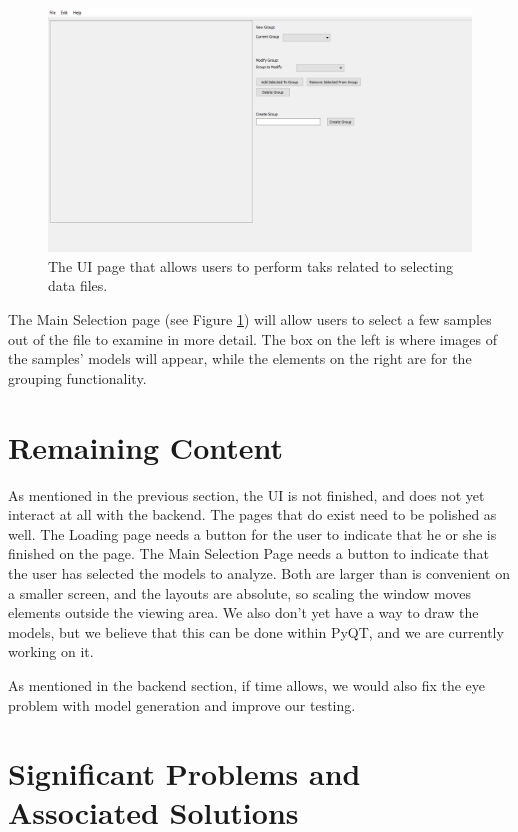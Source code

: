 \documentclass[letterpaper,10pt, onecolumn]{IEEEtran}
\begin{document}
\begin{figure}
	\includegraphics[width=\textwidth]{MainInterface}
	\caption{The UI page that allows users to perform taks related to selecting data files.}
	\label{fig:MainInterface}
\end{figure}

The Main Selection page (see Figure \ref{fig:MainInterface}) will allow users to select a few samples out of the file to examine in more detail. The box on the left is where images of the samples' models will appear, while the elements on the right are for the grouping functionality.

\section*{Remaining Content}

As mentioned in the previous section, the UI is not finished, and does not yet interact at all with the backend. The pages that do exist need to be polished as well. The Loading page needs a button for the user to indicate that he or she is finished on the page. The Main Selection Page needs a button to indicate that the user has selected the models to analyze. Both are larger than is convenient on a smaller screen, and the layouts are absolute, so scaling the window moves elements outside the viewing area. We also don't yet have a way to draw the models, but we believe that this can be done within PyQT, and we are currently working on it.

As mentioned in the backend section, if time allows, we would also fix the eye problem with model generation and improve our testing.

\section*{Significant Problems and Associated Solutions}
\end{document}
